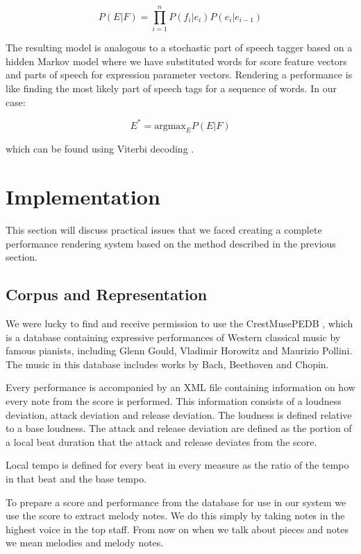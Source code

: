 \documentclass[a4paper,10pt]{article}
\begin{document}
\[
P(E|F) = \displaystyle\prod_{i=1}^{n}P(f_i|e_i)P(e_i|e_{i-1})
\]

The resulting model is analogous to a stochastic part of speech tagger based on a hidden Markov model where we have substituted words for score feature vectors and parts of speech for expression parameter vectors. Rendering a performance is like finding the most likely part of speech tags for a sequence of words. In our case:

\[E^* = \mbox{argmax}_E P(E|F)\]

which can be found using Viterbi decoding \cite{forney1973viterbi}.

\section{Implementation}
\label{sec:implementation}

This section will discuss practical issues that we faced creating a complete performance rendering system based on the method described in the previous section.

\subsection{Corpus and Representation}
\label{sec:corpus}
We were lucky to find and receive permission to use the CrestMusePEDB \cite{hashida2008new}, which is a database containing expressive performances of Western classical music by famous pianists, including Glenn Gould, Vladimir Horowitz and Maurizio Pollini. The music in this database includes works by Bach, Beethoven and Chopin.

Every performance is accompanied by an XML file containing information on how every note from the score is performed. This information consists of a loudness deviation, attack deviation and release deviation. The loudness is defined relative to a base loudness. The attack and release deviation are defined as the portion of a local beat duration that the attack and release deviates from the score. 

Local tempo is defined for every beat in every measure as the ratio of the tempo in that beat and the base tempo. 

To prepare a score and performance from the database for use in our system we use the score to extract melody notes. We do this simply by taking notes in the highest voice in the top staff. From now on when we talk about pieces and notes we mean melodies and melody notes.
\end{document}
